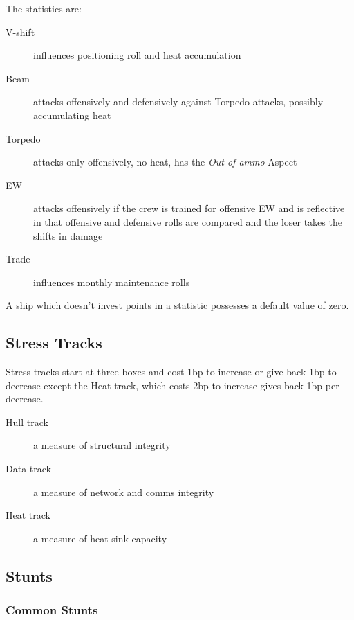 The statistics are:
\begin{description}
\item[V-shift] influences positioning roll and heat accumulation
\item[Beam] attacks offensively and defensively against Torpedo attacks,
possibly accumulating heat
\item[Torpedo] attacks only offensively, no heat, has the \emph{Out of ammo} Aspect
\item[EW] attacks offensively if the crew is trained for offensive EW and is
reflective in that offensive and defensive rolls are compared and the
loser takes the shifts in damage
\item[Trade] influences monthly maintenance rolls
\end{description}

A ship which doesn't invest points in a statistic possesses a default
value of zero.

\subsection{Stress Tracks}\label{sec:spacecraft-stress-tracks} %

Stress tracks start at three boxes and cost 1bp to increase or give
back 1bp to decrease except the Heat track, which costs 2bp to
increase gives back 1bp per decrease.
\begin{description}
\item[Hull track] a measure of structural integrity
\item[Data track] a measure of network and comms integrity
\item[Heat track] a measure of heat sink capacity
\end{description}

\subsection{Stunts}\label{sec:spacecraft-stunts} %

\subsubsection{Common Stunts}\label{sec:spacecraft-common-stunts}

